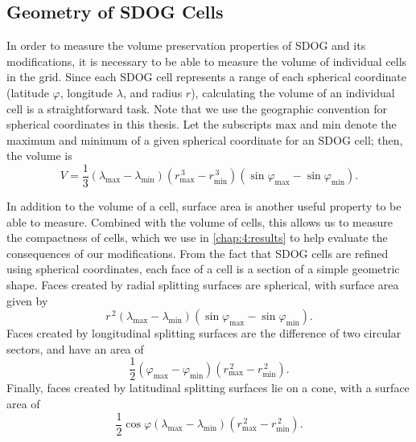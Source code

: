 \subsection{Geometry of SDOG Cells} \label{chap:4:geom}
In order to measure the volume preservation properties of SDOG and its modifications, it is necessary to be able to measure the volume of individual cells in the grid.
Since each SDOG cell represents a range of each spherical coordinate (latitude $\varphi$, longitude $\lambda$, and radius $r$), calculating the volume of an individual cell is a straightforward task.
Note that we use the geographic convention for spherical coordinates in this thesis.
Let the subscripts $\mathrm{max}$ and $\mathrm{min}$ denote the maximum and minimum of a given spherical coordinate for an SDOG cell; then, the volume is \cite{yu2009sdog}
%
\begin{equation} \label{eq:volume}
V = \frac{1}{3} \left( \lambda_\mathrm{max} - \lambda_\mathrm{min} \right) \left(r_\mathrm{max}^{\,3} - r_\mathrm{min}^{\,3} \right) \left(\sin\varphi_\mathrm{max} - \sin\varphi_\mathrm{min} \right).
\end{equation}


In addition to the volume of a cell, surface area is another useful property to be able to measure.
Combined with the volume of cells, this allows us to measure the compactness of cells, which we use in \cref{chap:4:results} to help evaluate the consequences of our modifications.
From the fact that SDOG cells are refined using spherical coordinates, each face of a cell is a section of a simple geometric shape.
Faces created by radial splitting surfaces are spherical, with surface area given by
%
\begin{equation*}
r^{\,2} \left( \lambda_\mathrm{max} - \lambda_\mathrm{min} \right) \left( \sin\varphi_\mathrm{max} - \sin\varphi_\mathrm{min} \right).
\end{equation*}
%
Faces created by longitudinal splitting surfaces are the difference of two circular sectors, and have an area of
%
\begin{equation*}
\frac{1}{2} \left( \varphi_\mathrm{max} - \varphi_\mathrm{min} \right) \left( r_\mathrm{max}^{\,2} - r_\mathrm{min}^{\,2} \right).
\end{equation*}
%
Finally, faces created by latitudinal splitting surfaces lie on a cone, with a surface area of
%
\begin{equation*}
\frac{1}{2} \cos\varphi \left( \lambda_\mathrm{max} - \lambda_\mathrm{min} \right) \left( r_\mathrm{max}^{\,2} - r_\mathrm{min}^{\,2} \right).
\end{equation*}


